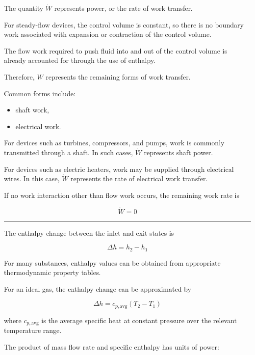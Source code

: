 \documentclass[12pt]{article}
\newcommand{\mysubsection}[2]{%
    \vspace{5px}
    \noindent{\headingfont\large #1\space #2\par}
    \vspace{4pt}
    \hrule
    \vspace{15pt}
}
\begin{document}
The quantity $\dot{W}$ represents power, or the rate of work transfer.

For steady-flow devices, the control volume is constant, so there is no boundary work associated with expansion or contraction of the control volume.

The flow work required to push fluid into and out of the control volume is already accounted for through the use of enthalpy.

Therefore, $\dot{W}$ represents the remaining forms of work transfer.

Common forms include:

\begin{itemize}
    \item shaft work,
    \item electrical work.
\end{itemize}

For devices such as turbines, compressors, and pumps, work is commonly transmitted through a shaft. In such cases, $\dot{W}$ represents shaft power.

For devices such as electric heaters, work may be supplied through electrical wires. In this case, $\dot{W}$ represents the rate of electrical work transfer.

If no work interaction other than flow work occurs, the remaining work rate is

\begin{equation*}
\dot{W}=0
\end{equation*}

\mysubsection{}{Enthalpy Change}

The enthalpy change between the inlet and exit states is

\begin{equation*}
\Delta h=h_2-h_1
\end{equation*}

For many substances, enthalpy values can be obtained from appropriate thermodynamic property tables.

For an ideal gas, the enthalpy change can be approximated by

\begin{equation*}
\Delta h
=
c_{p,\mathrm{avg}}(T_2-T_1)
\end{equation*}

where $c_{p,\mathrm{avg}}$ is the average specific heat at constant pressure over the relevant temperature range.

The product of mass flow rate and specific enthalpy has units of power:
\end{document}
